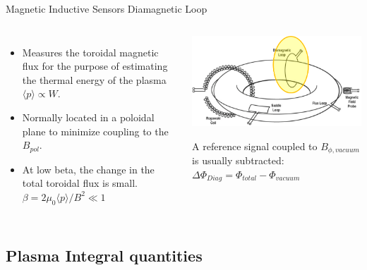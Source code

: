 \documentclass{beamer}
\begin{document}
\begin{frame}{Magnetic Inductive Sensors } {Diamagnetic Loop}
\begin{columns}
     \begin{itemize}
	 \item Measures the toroidal magnetic flux for the purpose of estimating the thermal energy of the plasma $\langle p \rangle  \propto W$.
	 \item Normally located in a poloidal plane  to minimize coupling to the $B_{pol}$.
	\item At low beta, the change in the total toroidal flux is small.
	$\beta = 2 \mu_0 \langle p \rangle  /B^2 \ll 1$
     \end{itemize}
	\begin{center}
	\includegraphics[width=1.0\columnwidth]{diamag.png}
	 \begin{block}{}
		 A reference signal coupled to $B_{\phi, vacuum}$ is usually subtracted:
		$ \Delta \Phi_{Diag} =  \Phi_{total}  -   \Phi_{vacuum}$ %
	\end{block}
	\end{center}

\end{columns}
\end{frame}

\subsection{Plasma Integral  quantities }
\end{document}
